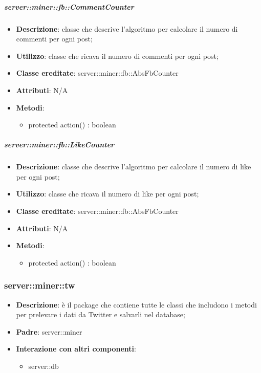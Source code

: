 	\subparagraph{server::miner::fb::CommentCounter} %
		\label{subp:server_miner_fb_CommentCounter}
			\begin{itemize}
				\item \textbf{Descrizione}: classe che descrive l'algoritmo per calcolare il numero di commenti per ogni post;
				\item \textbf{Utilizzo}: classe che ricava il numero di commenti per ogni post;
				\item \textbf{Classe ereditate}: server::miner::fb::AbsFbCounter
				\item \textbf{Attributi}: N/A
				\item \textbf{Metodi}:  
					\begin{itemize}
						\item protected action() : boolean
					\end{itemize}
			\end{itemize}

	\subparagraph{server::miner::fb::LikeCounter} %
		\label{subp:server_miner_fb_LikeCounter}
			\begin{itemize}
				\item \textbf{Descrizione}: classe che descrive l'algoritmo per calcolare il numero di like per ogni post;
				\item \textbf{Utilizzo}: classe che ricava il numero di like per ogni post;
				\item \textbf{Classe ereditate}: server::miner::fb::AbsFbCounter
				\item \textbf{Attributi}: N/A
				\item \textbf{Metodi}:  
					\begin{itemize}
						\item protected action() : boolean
					\end{itemize}
			\end{itemize}

\subsubsection{server::miner::tw} %
\label{ssub:bdsm_app_server_miner_tw}

\begin{itemize}
  \item \textbf{Descrizione}: è il package che contiene tutte le classi che includono i metodi per prelevare i dati da Twitter e salvarli nel database;
  \item \textbf{Padre}: server::miner
  \item \textbf{Interazione con altri componenti}:
  	\begin{itemize}
  		\item server::db
  	\end{itemize}
\end{itemize}

